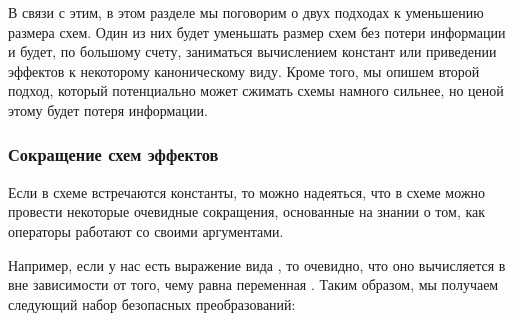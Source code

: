 В связи с этим, в этом разделе мы поговорим о двух подходах к уменьшению размера схем. Один из них будет уменьшать размер схем без потери информации и будет, по большому счету, заниматься вычислением констант или приведении эффектов к некоторому каноническому виду. Кроме того, мы опишем второй подход, который потенциально может сжимать схемы намного сильнее, но ценой этому будет потеря информации. 


\subsubsection{Сокращение схем эффектов}

Если в схеме встречаются константы, то можно надеяться, что в схеме можно провести некоторые очевидные сокращения, основанные на знании о том, как операторы работают со своими аргументами.

Например, если у нас есть выражение вида , то очевидно, что оно вычисляется в  вне зависимости от того, чему равна переменная . Таким образом, мы получаем следующий набор безопасных преобразований:

